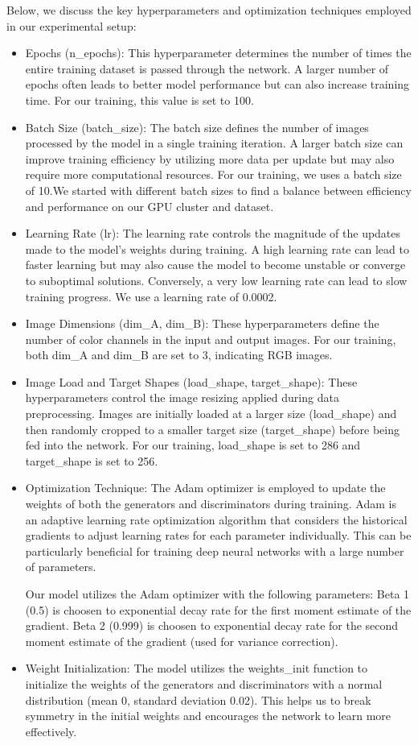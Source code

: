 \documentclass[UKenglish,12pt]{master-style}
\begin{document}
Below, we discuss the key hyperparameters and optimization techniques employed in our experimental setup: 
\begin{itemize}
\item Epochs (n\_epochs): This hyperparameter determines the number of times the entire training dataset is passed through the network. A larger number of epochs often leads to better model performance but can also increase training time. For our training, this value is set to 100.
\item Batch Size (batch\_size): The batch size defines the number of images processed by the model in a single training iteration. A larger batch size can improve training efficiency by utilizing more data per update but may also require more computational resources. For our training, we uses a batch size of 10.We started with different batch sizes to find a balance between efficiency and performance on our GPU cluster and dataset.
\item Learning Rate (lr): The learning rate controls the magnitude of the updates made to the model's weights during training. A high learning rate can lead to faster learning but may also cause the model to become unstable or converge to suboptimal solutions. Conversely, a very low learning rate can lead to slow training progress. We use a learning rate of 0.0002. 
\item Image Dimensions (dim\_A, dim\_B): These hyperparameters define the number of color channels in the input and output images. For our training, both dim\_A and dim\_B are set to 3, indicating RGB images.
\item Image Load and Target Shapes (load\_shape, target\_shape): These hyperparameters control the image resizing applied during data preprocessing. Images are initially loaded at a larger size (load\_shape) and then randomly cropped to a smaller target size (target\_shape) before being fed into the network. For our training, load\_shape is set to 286 and target\_shape is set to 256.
\item Optimization Technique: The Adam optimizer is employed to update the weights of both the generators and discriminators during training. Adam is an adaptive learning rate optimization algorithm that considers the historical gradients to adjust learning rates for each parameter individually. This can be particularly beneficial for training deep neural networks with a large number of parameters.

Our model utilizes the Adam optimizer with the following parameters: Beta 1 (0.5) is choosen to exponential decay rate for the first moment estimate of the gradient. Beta 2 (0.999) is choosen to exponential decay rate for the second moment estimate of the gradient (used for variance correction).
\item Weight Initialization: The model utilizes the weights\_init function to initialize the weights of the generators and discriminators with a normal distribution (mean 0, standard deviation 0.02). This helps us to break symmetry in the initial weights and encourages the network to learn more effectively.
\end{itemize}
\end{document}
